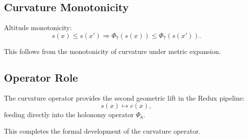 \subsection{Curvature Monotonicity}

Altitude monotonicity:
\[
s(x) \le s(x') \Rightarrow \Phi_7(s(x)) \le \Phi_7(s(x')).
\]

This follows from the monotonicity of curvature under metric expansion.

\subsection{Operator Role}

The curvature operator provides the second geometric lift in the Redux
pipeline:
\[
s(x) \mapsto c(x),
\]
feeding directly into the holonomy operator $\Phi_8$.

This completes the formal development of the curvature operator.
